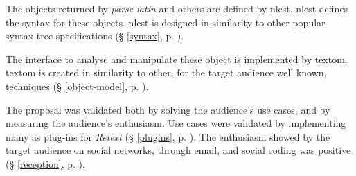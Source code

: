 The objects returned by \emph{parse-latin} and others are defined by
  \acrshort{nlcst}. \acrshort{nlcst} defines the syntax for these objects.
  \acrshort{nlcst} is designed in similarity to other popular syntax tree
  specifications (§ \ref{syntax}, p. \pageref{syntax}).

The interface to analyse and manipulate these object is implemented by
  \gls{textom}. \gls{textom} is created in similarity to other, for the target
  audience well known, techniques
  (§ \ref{object-model}, p. \pageref{object-model}).

The proposal was validated both by solving the audience's use cases, and
  by measuring the audience's enthusiasm.
Use cases were validated by implementing many as plug-ins for
  \emph{Retext} (§ \ref{plugins}, p. \pageref{plugins}).
The enthusiasm showed by the target audience on social networks, through
  email, and social coding was positive
  (§ \ref{reception}, p. \pageref{reception}).

\endgroup
